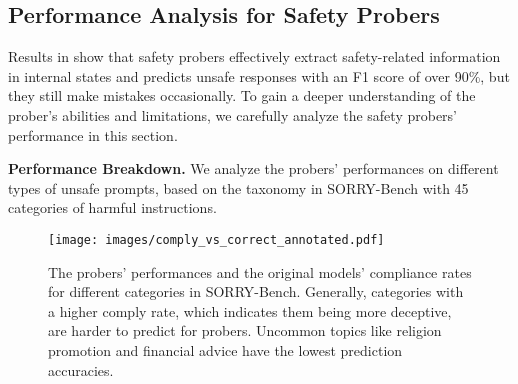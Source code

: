 



\subsection{Performance Analysis for Safety Probers}
\label{app:analysis}

Results in  show that safety probers effectively extract safety-related information in internal states and predicts unsafe responses with an F1 score of over 90\%, but they still make mistakes occasionally. To gain a deeper understanding of the prober's abilities and limitations, we carefully analyze the safety probers' performance in this section.

\textbf{Performance Breakdown.} We analyze the probers' performances on different types of unsafe prompts, based on the taxonomy in SORRY-Bench with 45 categories of harmful instructions.


\begin{figure}
    \centering
    \texttt{[image: images/comply\_vs\_correct\_annotated.pdf]}
    \caption{The probers' performances and the original models' compliance rates for different categories in SORRY-Bench. Generally, categories with a higher comply rate, which indicates them being more deceptive, are harder to predict for probers. Uncommon topics like religion promotion and financial advice have the lowest prediction accuracies.}\label{fig:comply_correct}
\end{figure}

